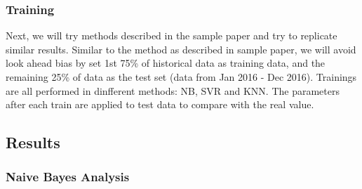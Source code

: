 \documentclass[]{article}
\newenvironment{Shaded}{\begin{snugshade}}{\end{snugshade}}
\newcommand{\KeywordTok}[1]{\textcolor[rgb]{0.13,0.29,0.53}{\textbf{#1}}}
\newcommand{\DataTypeTok}[1]{\textcolor[rgb]{0.13,0.29,0.53}{#1}}
\newcommand{\DecValTok}[1]{\textcolor[rgb]{0.00,0.00,0.81}{#1}}
\newcommand{\StringTok}[1]{\textcolor[rgb]{0.31,0.60,0.02}{#1}}
\newcommand{\CommentTok}[1]{\textcolor[rgb]{0.56,0.35,0.01}{\textit{#1}}}
\newcommand{\OperatorTok}[1]{\textcolor[rgb]{0.81,0.36,0.00}{\textbf{#1}}}
\newcommand{\NormalTok}[1]{#1}
\begin{document}

\subsubsection{Training}\label{training}

Next, we will try methods described in the sample paper and try to
replicate similar results. Similar to the method as described in sample
paper, we will avoid look ahead bias by set 1st 75\% of historical data
as training data, and the remaining 25\% of data as the test set (data
from Jan 2016 - Dec 2016). Trainings are all performed in dinfferent
methods: NB, SVR and KNN. The parameters after each train are applied to
test data to compare with the real value.

\newpage

\subsection{Results}\label{results}

\subsubsection{Naive Bayes Analysis}\label{naive-bayes-analysis}

\begin{Shaded}
\end{Shaded}
\end{document}
